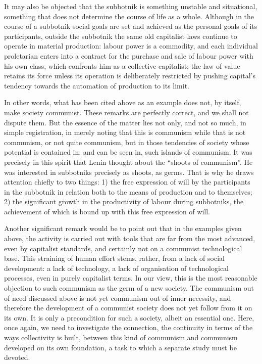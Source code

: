 \documentclass[12pt,a4paper,openany]{book}
\begin{document}
It may also be objected that the subbotnik is something unstable and situational, something that does not determine the course of life as a whole. Although in the course of a subbotnik social goals are set and achieved as the personal goals of its participants, outside the subbotnik the same old capitalist laws continue to operate in material production: labour power is a commodity, and each individual proletarian enters into a contract for the purchase and sale of labour power with his own class, which confronts him as a collective capitalist; the law of value retains its force unless its operation is deliberately restricted by pushing capital’s tendency towards the automation of production to its limit.

In other words, what has been cited above as an example does not, by itself, make society communist. These remarks are perfectly correct, and we shall not dispute them. But the essence of the matter lies not only, and not so much, in simple registration, in merely noting that this is communism while that is not communism, or not quite communism, but in those tendencies of society whose potential is contained in, and can be seen in, such islands of communism. It was precisely in this spirit that Lenin thought about the “shoots of communism”. He was interested in subbotniks precisely as shoots, as germs. That is why he draws attention chiefly to two things: 1) the free expression of will by the participants in the subbotnik in relation both to the means of production and to themselves; 2) the significant growth in the productivity of labour during subbotniks, the achievement of which is bound up with this free expression of will.

Another significant remark would be to point out that in the examples given above, the activity is carried out with tools that are far from the most advanced, even by capitalist standards, and certainly not on a communist technological base. This straining of human effort stems, rather, from a lack of social development: a lack of technology, a lack of organisation of technological processes, even in purely capitalist terms. In our view, this is the most reasonable objection to such communism as the germ of a new society. The communism out of need discussed above is not yet communism out of inner necessity, and therefore the development of a communist society does not yet follow from it on its own. It is only a precondition for such a society, albeit an essential one. Here, once again, we need to investigate the connection, the continuity in terms of the ways collectivity is built, between this kind of communism and communism developed on its own foundation, a task to which a separate study must be devoted.
\end{document}
